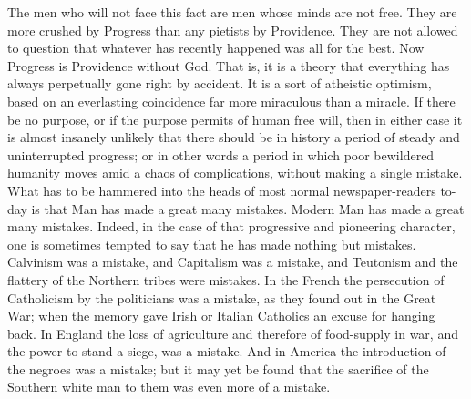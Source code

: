 \documentclass{book}
\begin{document}
The men who will not face this fact are men whose minds are not free. They are more crushed by Progress than any pietists by Providence. They are not allowed to question that whatever has recently happened was all for the best. Now Progress is Providence without God. That is, it is a theory that everything has always perpetually gone right by accident. It is a sort of atheistic optimism, based on an everlasting coincidence far more miraculous than a miracle. If there be no purpose, or if the purpose permits of human free will, then in either case it is almost insanely unlikely that there should be in history a period of steady and uninterrupted progress; or in other words a period in which poor bewildered humanity moves amid a chaos of complications, without making a single mistake. What has to be hammered into the heads of most normal newspaper-readers to-day is that Man has made a great many mistakes. Modern Man has made a great many mistakes. Indeed, in the case of that progressive and pioneering character, one is sometimes tempted to say that he has made nothing but mistakes. Calvinism was a mistake, and Capitalism was a mistake, and Teutonism and the flattery of the Northern tribes were mistakes. In the French the persecution of Catholicism by the politicians was a mistake, as they found out in the Great War; when the memory gave Irish or Italian Catholics an excuse for hanging back. In England the loss of agriculture and therefore of food-supply in war, and the power to stand a siege, was a mistake. And in America the introduction of the negroes was a mistake; but it may yet be found that the sacrifice of the Southern white man to them was even more of a mistake.
\end{document}
